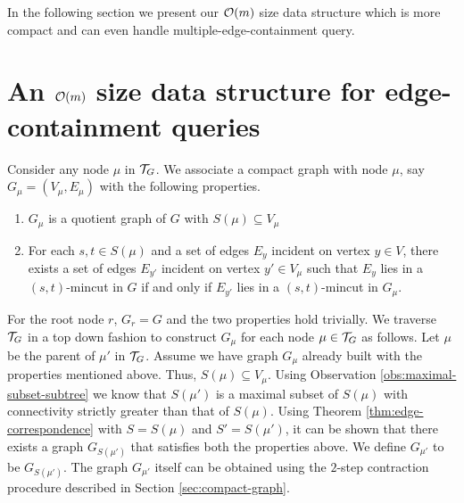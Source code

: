 In the following section we present our ${\cal O}(m)$ size data structure which is more compact and can even handle multiple-edge-containment query.


\section{An \texorpdfstring{${\cal O}(m)$}{O(m)} size data structure for edge-containment queries}

Consider any node $\mu$ in ${\cal T}_G$. We associate a compact graph with node $\mu$, say $G_\mu=(V_\mu,E_\mu)$ with the following properties. 

\begin{enumerate}
    \item $G_\mu$ is a quotient graph of $G$ with $S(\mu)\subseteq V_\mu$
    \item  For each $s,t\in S(\mu)$ and a set of edges $E_y$ incident on vertex $y\in V$, there exists a set of edges $E_{y'}$ incident on vertex $y'\in V_\mu$ such that $E_y$ lies in a $(s,t)$-mincut in $G$ if and only if $E_{y'}$ lies in a $(s,t)$-mincut in $G_\mu$.
\end{enumerate}

For the root node $r$, $G_r=G$ and the two properties hold trivially.
We traverse ${\cal T}_G$ in a top down fashion to construct $G_\mu$ for each node $\mu \in {\cal T}_G$ as follows. Let $\mu$ be the parent of $\mu'$ in ${\cal T}_G$. Assume we have graph $G_{\mu}$ already built with the properties mentioned above. Thus, $S(\mu)\subseteq V_\mu$. Using Observation \ref{obs:maximal-subset-subtree} we know that $S(\mu')$ is a maximal subset of $S(\mu)$ with connectivity strictly greater than that of $S(\mu)$. Using Theorem \ref{thm:edge-correspondence} with $S=S(\mu)$ and $S'=S(\mu')$, it can be shown that there exists a graph $G_{S(\mu')}$ 
that satisfies both the properties above. We define $G_{\mu'}$ to be $G_{S(\mu')}$.
The graph $G_{\mu'}$ itself
can be obtained using the $2$-step contraction procedure described in Section \ref{sec:compact-graph}.



